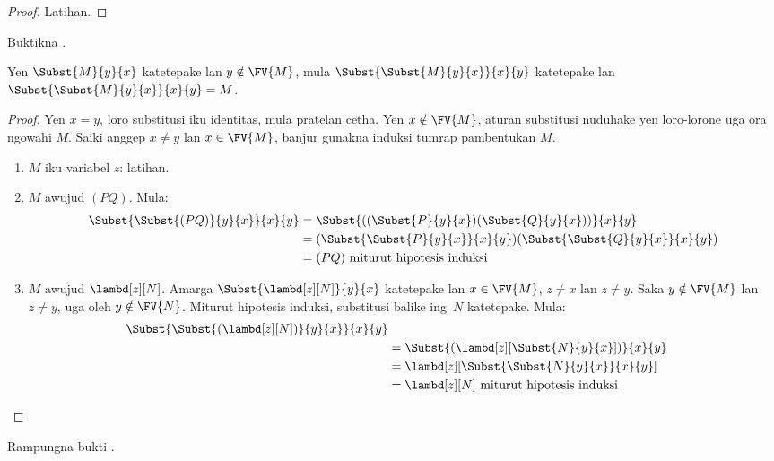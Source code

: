 \documentclass[../../../include/open-logic-section]{subfiles}
\begin{document}
\begin{proof}
  Latihan.
\end{proof}

\begin{prob}
  Buktikna .
\end{prob}


\begin{thm}
  Yen $\Subst{M}{y}{x}$ katetepake
  lan $y \notin \FV{M}$,
  mula $\Subst{\Subst{M}{y}{x}}{x}{y}$
  katetepake lan
  $\Subst{\Subst{M}{y}{x}}{x}{y} = M$.
\end{thm}

\begin{proof}
  Yen $x=y$, loro substitusi iku
  identitas, mula pratelan cetha.
  Yen $x \notin \FV{M}$, aturan
  substitusi nuduhake yen loro-lorone
  uga ora ngowahi $M$.
  Saiki anggep $x \neq y$ lan
  $x \in \FV{M}$, banjur gunakna
  induksi tumrap pambentukan $M$.
  \begin{enumerate}
  \item $M$ iku variabel $z$: latihan.
  \item $M$ awujud $(PQ)$. Mula:
    \begin{align*}
      \Subst{\Subst{(PQ)}{y}{x}}{x}{y}
      &=\Subst{((\Subst{P}{y}{x})(\Subst{Q}{y}{x}))}{x}{y} \\
      &= (\Subst{\Subst{P}{y}{x}}{x}{y})(\Subst{\Subst{Q}{y}{x}}{x}{y}) \\
      &= (PQ) \text{ miturut hipotesis induksi}
    \end{align*}
  \item $M$ awujud $\lambd[z][N]$.
    Amarga $\Subst{\lambd[z][N]}{y}{x}$
    katetepake lan $x \in \FV{M}$,
    $z \neq x$ lan $z \neq y$.
    Saka $y \notin \FV{M}$ lan
    $z \neq y$, uga oleh
    $y \notin \FV{N}$.
    Miturut hipotesis induksi, substitusi
    balike ing~$N$ katetepake. Mula:
    \begin{align*}
      \Subst{\Subst{(\lambd[z][N])}{y}{x}}{x}{y}\\
      & = \Subst{(\lambd[z][\Subst{N}{y}{x}])}{x}{y} \\
      & = \lambd[z][\Subst{\Subst{N}{y}{x}}{x}{y}] \\
      &= \lambd[z][N] \text{ miturut hipotesis induksi} 
    \end{align*}
  \end{enumerate}
\end{proof}

\begin{prob}
  Rampungna bukti .
\end{prob}
\end{document}
